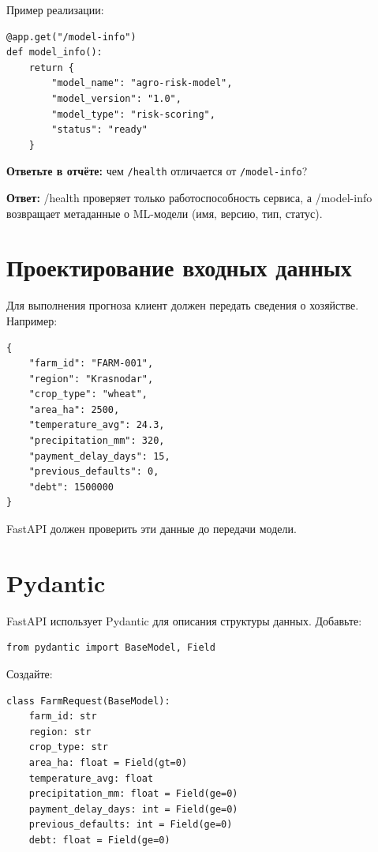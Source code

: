 \documentclass[12pt,a4paper]{article}
\begin{document}
Пример реализации:

\begin{lstlisting}[caption={Endpoint /model-info}]
@app.get("/model-info")
def model_info():
    return {
        "model_name": "agro-risk-model",
        "model_version": "1.0",
        "model_type": "risk-scoring",
        "status": "ready"
    }
\end{lstlisting}

\textbf{Ответьте в отчёте:} чем \texttt{/health} отличается от \texttt{/model-info}?

\textbf{Ответ:} /health проверяет только работоспособность сервиса, а /model-info возвращает метаданные о ML-модели (имя, версию, тип, статус).

\section{Проектирование входных данных}

Для выполнения прогноза клиент должен передать сведения о хозяйстве. Например:

\begin{lstlisting}[caption={Пример входных данных}]
{
    "farm_id": "FARM-001",
    "region": "Krasnodar",
    "crop_type": "wheat",
    "area_ha": 2500,
    "temperature_avg": 24.3,
    "precipitation_mm": 320,
    "payment_delay_days": 15,
    "previous_defaults": 0,
    "debt": 1500000
}
\end{lstlisting}

FastAPI должен проверить эти данные до передачи модели.

\section{Pydantic}

FastAPI использует Pydantic для описания структуры данных. Добавьте:

\begin{lstlisting}[caption={Импорт Pydantic}]
from pydantic import BaseModel, Field
\end{lstlisting}

Создайте:

\begin{lstlisting}[caption={Модель FarmRequest}]
class FarmRequest(BaseModel):
    farm_id: str
    region: str
    crop_type: str
    area_ha: float = Field(gt=0)
    temperature_avg: float
    precipitation_mm: float = Field(ge=0)
    payment_delay_days: int = Field(ge=0)
    previous_defaults: int = Field(ge=0)
    debt: float = Field(ge=0)
\end{lstlisting}
\end{document}
